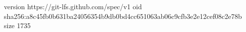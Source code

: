 version https://git-lfs.github.com/spec/v1
oid sha256:a8c45fb0b631ba24056354b9db0bd4cc651063ab06c9cfb3e2e12cef08c2e78b
size 1735
